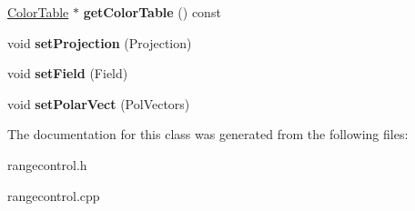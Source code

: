 \begin{DoxyCompactItemize}
\item 
\hypertarget{classRangeControl_a95b28afc016185d8b317f149a35c6120}{
\hyperlink{classColorTable}{ColorTable} $\ast$ {\bfseries getColorTable} () const }
\label{classRangeControl_a95b28afc016185d8b317f149a35c6120}

\item 
\hypertarget{classRangeControl_a0f2ba6610da475e23c7b28df6f4b7c05}{
void {\bfseries setProjection} (Projection)}
\label{classRangeControl_a0f2ba6610da475e23c7b28df6f4b7c05}

\item 
\hypertarget{classRangeControl_a31b29d8c0675f56dfed0b724b9c01c75}{
void {\bfseries setField} (Field)}
\label{classRangeControl_a31b29d8c0675f56dfed0b724b9c01c75}

\item 
\hypertarget{classRangeControl_aeba60dde51d9174b5fc45529a5dc037e}{
void {\bfseries setPolarVect} (PolVectors)}
\label{classRangeControl_aeba60dde51d9174b5fc45529a5dc037e}

\end{DoxyCompactItemize}


The documentation for this class was generated from the following files:\begin{DoxyCompactItemize}
\item 
rangecontrol.h\item 
rangecontrol.cpp\end{DoxyCompactItemize}
